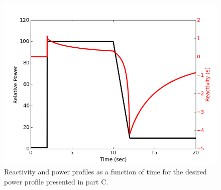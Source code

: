 \documentclass[12pt]{report}
\begin{document}
	\begin{figure}[h!]
		\begin{center}
			\includegraphics[scale=0.7]{partC.png}
		\end{center}
		\caption{Reactivity and power profiles as a function of time for the desired power profile presented in part C.}
		\label{ike2}
	\end{figure}
	
	
\end{document}
